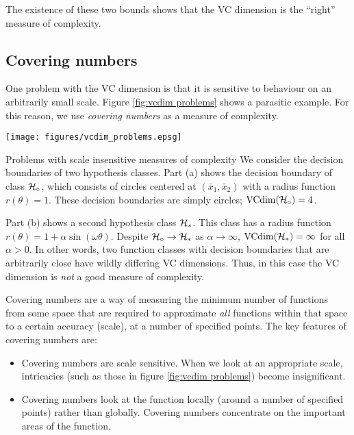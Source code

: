 The existence of these two bounds shows that the VC dimension is the
``right'' measure of complexity.  



\subsection{Covering numbers}
\label{sec:covering numbers}

One problem with the VC dimension is that it is sensitive to behaviour
on an arbitrarily small scale.  Figure \ref{fig:vcdim problems} shows
a parasitic example.  For this reason, we use \emph{covering numbers}
as a measure of complexity.

\begin{linefigure}
\begin{center}
\texttt{[image: figures/vcdim\_problems.epsg]}
\end{center}
\begin{capt}{Problems with scale insensitive measures of complexity}
We consider the decision boundaries of two hypothesis classes.  Part
(a) shows the decision boundary of class $\mathcal{H}_{\circ}$,
which consists of circles centered at $(\bar{x}_1, \bar{x}_2)$ with a
radius function $r(\theta) = 1$.  These decision boundaries are simply
circles; $\mathrm{VCdim}(\mathcal{H}_{\circ}) = 4$.

Part (b) shows a second hypothesis class $\mathcal{H}_{\ast}$.  This class
has a radius function $r(\theta) = 1 + \alpha \sin(\omega \theta)$.
Despite $\mathcal{H}_{\circ} \rightarrow \mathcal{H}_{\ast}$ as $\alpha
\rightarrow \infty$, $\mathrm{VCdim}(\mathcal{H}_{\ast}) = \infty$ for all $\alpha >
0$.  In other words, two function classes with decision boundaries
that are arbitrarily close have wildly differing VC dimensions.  Thus,
in this case the VC dimension is \emph{not} a good measure of
complexity.
\end{capt}
\label{fig:vcdim problems}
\end{linefigure}

Covering numbers are a way of measuring the minimum number of
functions from some space that are required to approximate \emph{all}
functions within that space to a certain accuracy (scale), at a number
of specified points.  The key features of covering numbers are:
%
\begin{itemize}
\item	Covering numbers are scale sensitive.  When we look at an
	appropriate scale, intricacies (such as those in figure
	\ref{fig:vcdim problems}) become insignificant.
\item	Covering numbers look at the function locally (around a number
	of specified points) rather than globally.  Covering
	numbers concentrate on the important areas of the function.
\end{itemize}

